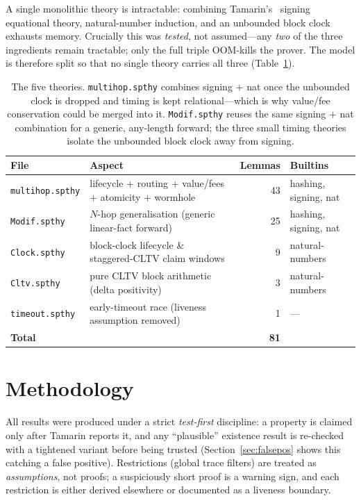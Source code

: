 \documentclass[11pt]{article}
\begin{document}
A single monolithic theory is intractable: combining Tamarin's~\cite{tamarin}
signing equational theory, natural-number induction, and an unbounded block
clock exhausts memory. Crucially this was \emph{tested}, not assumed---any
\emph{two} of the three ingredients remain tractable; only the full triple
OOM-kills the prover. The model is therefore split so that no single theory
carries all three (Table~\ref{tab:files}).

\begin{table}[h]
\centering
\small
\begin{tabular}{@{}llrl@{}}
\toprule
\textbf{File} & \textbf{Aspect} & \textbf{Lemmas} & \textbf{Builtins} \\
\midrule
\texttt{multihop.spthy}      & lifecycle + routing + value/fees + atomicity + wormhole & 43 & hashing, signing, nat \\
\texttt{Modif.spthy} & $N$-hop generalisation (generic linear-fact forward)    & 25 & hashing, signing, nat \\
\texttt{Clock.spthy}         & block-clock lifecycle \& staggered-CLTV claim windows   & 9  & natural-numbers \\
\texttt{Cltv.spthy}   & pure CLTV block arithmetic (delta positivity)           & 3  & natural-numbers \\
\texttt{timeout.spthy}       & early-timeout race (liveness assumption removed)        & 1  & --- \\
\midrule
\textbf{Total} & & \textbf{81} & \\
\bottomrule
\end{tabular}
\caption{The five theories. \texttt{multihop.spthy} combines signing $+$ nat
once the unbounded clock is dropped and timing is kept relational---which is why
value/fee conservation could be merged into it. \texttt{Modif.spthy}
reuses the same signing $+$ nat combination for a generic, any-length forward;
the three small timing theories isolate the unbounded block clock away from
signing.}
\label{tab:files}
\end{table}

\section{Methodology}

All results were produced under a strict \emph{test-first} discipline: a
property is claimed only after Tamarin reports it, and any ``plausible''
existence result is re-checked with a tightened variant before being trusted
(Section~\ref{sec:falsepos} shows this catching a false positive). Restrictions
(global trace filters) are treated as \emph{assumptions}, not proofs; a
suspiciously short proof is a warning sign, and each restriction is either
derived elsewhere or documented as a liveness boundary.
\end{document}
